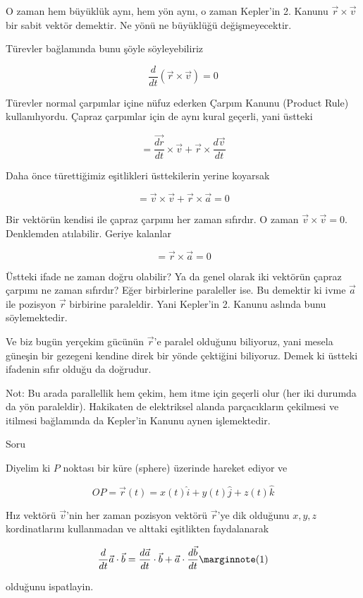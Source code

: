 \documentclass[12pt,fleqn]{article}\usepackage{../../common}
\begin{document}
O zaman hem büyüklük aynı, hem yön aynı, o zaman Kepler'in 2. Kanunu $\vec{r}
\times \vec{v}$ bir sabit vektör demektir. Ne yönü ne büyüklüğü değişmeyecektir.

Türevler bağlamında bunu şöyle söyleyebiliriz

$$ \frac{d}{dt}(\vec{r} \times \vec{v}) = 0 $$

Türevler normal çarpımlar içine nüfuz ederken Çarpım Kanunu (Product Rule)
kullanılıyordu. Çapraz çarpımlar için de aynı kural geçerli, yani üstteki

$$ = \frac{\vec{dr}}{dt} \times \vec{v} + \vec{r} \times \frac{d\vec{v}}{dt} $$

Daha önce türettiğimiz eşitlikleri üsttekilerin yerine koyarsak

$$ =\vec{v} \times \vec{v} + \vec{r} \times \vec{a} = 0$$

Bir vektörün kendisi ile çapraz çarpımı her zaman sıfırdır. O zaman $\vec{v}
\times \vec{v} = 0$. Denklemden atılabilir. Geriye kalanlar

$$ = \vec{r} \times \vec{a} = 0$$

Üstteki ifade ne zaman doğru olabilir? Ya da genel olarak iki vektörün çapraz
çarpımı ne zaman sıfırdır? Eğer birbirlerine paraleller ise. Bu demektir ki ivme
$\vec{a}$ ile pozisyon $\vec{r}$ birbirine paraleldir. Yani Kepler'in 2. Kanunu
aslında bunu söylemektedir.

Ve biz bugün yerçekim gücünün $\vec{r}$'e paralel olduğunu biliyoruz, yani
mesela güneşin bir gezegeni kendine direk bir yönde çektiğini biliyoruz. Demek
ki üstteki ifadenin sıfır olduğu da doğrudur.

Not: Bu arada parallellik hem çekim, hem itme için geçerli olur (her iki durumda
da yön paraleldir). Hakikaten de elektriksel alanda parçacıkların çekilmesi ve
itilmesi bağlamında da Kepler'in Kanunu aynen işlemektedir.

Soru

Diyelim ki $P$ noktası bir küre (sphere) üzerinde hareket ediyor ve 

$$ OP = \vec{r}(t) = x(t)\hat{i} + y(t)\hat{j} + z(t)\hat{k}  $$

Hız vektörü $\vec{v}$'nin her zaman pozisyon vektörü $\vec{r}$'ye dik
olduğunu $x,y,z$ kordinatlarını kullanmadan ve alttaki eşitlikten 
faydalanarak

$$
\frac{d}{dt}\vec{a} \cdot \vec{b} =  
\frac{d\vec{a}}{dt} \cdot \vec{b} +
\vec{a} \cdot \frac{d\vec{b}}{dt} 
\mlabel{1}
$$

olduğunu ispatlayin. 
\end{document}
